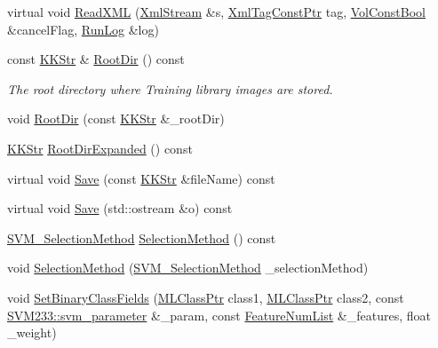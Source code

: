\begin{DoxyCompactItemize}
\item 
virtual void \hyperlink{class_k_k_m_l_l_1_1_training_configuration2_a409015ad92033b191f36e949a5d25510}{Read\+X\+ML} (\hyperlink{class_k_k_b_1_1_xml_stream}{Xml\+Stream} \&s, \hyperlink{namespace_k_k_b_a5f1b0b1667d79fec26deeff10c43df23}{Xml\+Tag\+Const\+Ptr} tag, \hyperlink{namespace_k_k_b_a7d390f568e2831fb76b86b56c87bf92f}{Vol\+Const\+Bool} \&cancel\+Flag, \hyperlink{class_k_k_b_1_1_run_log}{Run\+Log} \&log)
\item 
const \hyperlink{class_k_k_b_1_1_k_k_str}{K\+K\+Str} \& \hyperlink{class_k_k_m_l_l_1_1_training_configuration2_a1e3c8e069a8f2894ad4f6abc3efe5559}{Root\+Dir} () const 
\begin{DoxyCompactList}\small\item\em The root directory where Training library images are stored. \end{DoxyCompactList}\item 
void \hyperlink{class_k_k_m_l_l_1_1_training_configuration2_a1cc05431ff6ff445771d1ab74217c9ea}{Root\+Dir} (const \hyperlink{class_k_k_b_1_1_k_k_str}{K\+K\+Str} \&\+\_\+root\+Dir)
\item 
\hyperlink{class_k_k_b_1_1_k_k_str}{K\+K\+Str} \hyperlink{class_k_k_m_l_l_1_1_training_configuration2_ad2deb76253ed72d0a103d8bce98a8ca0}{Root\+Dir\+Expanded} () const 
\item 
virtual void \hyperlink{class_k_k_m_l_l_1_1_training_configuration2_a297581d31438e1c5c6bb8a9319f14f96}{Save} (const \hyperlink{class_k_k_b_1_1_k_k_str}{K\+K\+Str} \&file\+Name) const 
\item 
virtual void \hyperlink{class_k_k_m_l_l_1_1_training_configuration2_a1a911ee484d7cb1f667dcab17b4113ff}{Save} (std\+::ostream \&o) const 
\item 
\hyperlink{namespace_k_k_m_l_l_afab7be632987641e5805e770be7f6bf8}{S\+V\+M\+\_\+\+Selection\+Method} \hyperlink{class_k_k_m_l_l_1_1_training_configuration2_a093da1d72dee9c51e9cec347de9c9c57}{Selection\+Method} () const 
\item 
void \hyperlink{class_k_k_m_l_l_1_1_training_configuration2_ab082037fc0ea9665292b7f29c83585ca}{Selection\+Method} (\hyperlink{namespace_k_k_m_l_l_afab7be632987641e5805e770be7f6bf8}{S\+V\+M\+\_\+\+Selection\+Method} \+\_\+selection\+Method)
\item 
void \hyperlink{class_k_k_m_l_l_1_1_training_configuration2_a47e10524f6eec9cefd264b67b4e79b87}{Set\+Binary\+Class\+Fields} (\hyperlink{namespace_k_k_m_l_l_ac272393853d59e72e8456f14cd6d8c23}{M\+L\+Class\+Ptr} class1, \hyperlink{namespace_k_k_m_l_l_ac272393853d59e72e8456f14cd6d8c23}{M\+L\+Class\+Ptr} class2, const \hyperlink{struct_s_v_m233_1_1svm__parameter}{S\+V\+M233\+::svm\+\_\+parameter} \&\+\_\+param, const \hyperlink{class_k_k_m_l_l_1_1_feature_num_list}{Feature\+Num\+List} \&\+\_\+features, float \+\_\+weight)

\end{DoxyCompactItemize}
